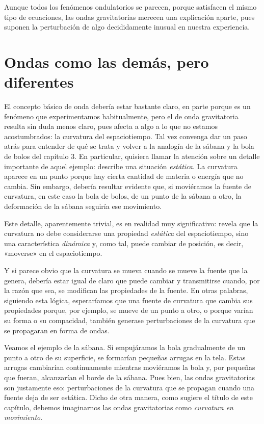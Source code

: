 Aunque todos los fenómenos ondulatorios se parecen, porque satisfacen el mismo tipo de ecuaciones, las ondas gravitatorias merecen una explicación aparte, pues suponen la perturbación de algo decididamente inusual en nuestra experiencia.

\section{Ondas como las demás, pero diferentes}\label{sec:08-waves}

El concepto básico de onda debería estar bastante claro, en parte porque es un fenómeno que experimentamos habitualmente, pero el de onda gravitatoria resulta sin duda menos claro, pues afecta a algo a lo que no estamos acostumbrados: la curvatura del espaciotiempo. Tal vez convenga dar un paso atrás para entender de qué se trata y volver a la analogía de la sábana y la bola de bolos del capítulo 3. En particular, quisiera llamar la atención sobre un detalle importante de aquel ejemplo: describe una situación \emph{estática}. La curvatura aparece en un punto porque hay cierta cantidad de materia o energía que no cambia. Sin embargo, debería resultar evidente que, si moviéramos la fuente de curvatura, en este caso la bola de bolos, de un punto de la sábana a otro, la deformación de la sábana seguiría ese movimiento.

Este detalle, aparentemente trivial, es en realidad muy significativo: revela que la curvatura no debe considerarse una propiedad \emph{estática} del espaciotiempo, sino una característica \emph{dinámica} y, como tal, puede cambiar de posición, es decir, «moverse» en el espaciotiempo.

Y si parece obvio que la curvatura se mueva cuando se mueve la fuente que la genera, debería estar igual de claro que puede cambiar y transmitirse cuando, por la razón que sea, se modifican las propiedades de la fuente. En otras palabras, siguiendo esta lógica, esperaríamos que una fuente de curvatura que cambia sus propiedades porque, por ejemplo, se mueve de un punto a otro, o porque varían su forma o su compacidad, también generase perturbaciones de la curvatura que se propagaran en forma de ondas.

Veamos el ejemplo de la sábana. Si empujáramos la bola gradualmente de un punto a otro de su superficie, se formarían pequeñas arrugas en la tela. Estas arrugas cambiarían continuamente mientras moviéramos la bola y, por pequeñas que fueran, alcanzarían el borde de la sábana. Pues bien, las ondas gravitatorias son justamente eso: perturbaciones de la curvatura que se propagan cuando una fuente deja de ser estática. Dicho de otra manera, como sugiere el título de este capítulo, debemos imaginarnos las ondas gravitatorias como \emph{curvatura en movimiento}.

